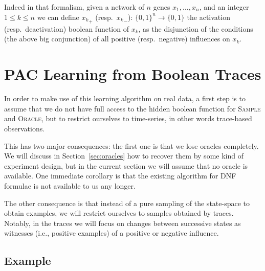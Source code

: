 \documentclass{llncs}
\newcommand{\sylvain}[1]{\textcolor{green}{#1}}
\begin{document}
  Indeed in that formalism, given a network of $n$ genes $x_1,\ldots,x_n$, and
  an integer $1 \leq k \leq n$ we can define ${x_k}_+$ (resp.\ ${x_k}_-$):
  ${\{0,1\}}^n \rightarrow\{0,1\}$ the activation (resp.\ deactivation)
  boolean function of $x_k$, as the disjunction of the conditions (the above
  big conjunction) of all positive (resp.\ negative) influences on $x_k$.





\section{PAC Learning from Boolean Traces}

In order to make use of this learning algorithm on real data, a first step is
to assume that we do not have full access to the hidden boolean function for
\textsc{Sample} and \textsc{Oracle}, but to restrict ourselves to time-series,
in other words trace-based observations.

This has two major consequences: the first one is that we lose oracles
completely. We will discuss in Section~\ref{sec:oracles} how to recover them
by some kind of experiment design, but in the current section we will assume
that no oracle is available. One immediate corollary is that the existing
algorithm for DNF formulae is not available to us any longer.

The other consequence is that instead of a pure sampling of the state-space to
obtain examples, we will restrict ourselves to samples obtained by traces.
Notably, in the traces we will focus on changes between successive states as
witnesses (i.e., positive examples) of a positive or negative influence.

\subsection{Example}
\end{document}
